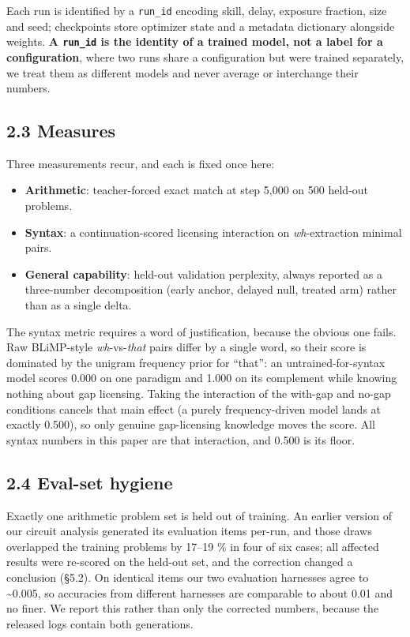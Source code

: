 \documentclass[11pt]{article}
\providecommand{\tightlist}{\setlength{\itemsep}{0pt}\setlength{\parskip}{0pt}}
\begin{document}
Each run is identified by a \texttt{run\_id} encoding skill, delay, exposure fraction, size and seed;
checkpoints store optimizer state and a metadata dictionary alongside weights. \textbf{A \texttt{run\_id}
is the identity of a trained model, not a label for a configuration}, where two runs share
a configuration but were trained separately, we treat them as different models and never
average or interchange their numbers.

\subsection{2.3 Measures}\label{measures}

Three measurements recur, and each is fixed once here:

\begin{itemize}
\tightlist
\item
  \textbf{Arithmetic}: teacher-forced exact match at step 5,000 on 500 held-out problems.
\item
  \textbf{Syntax}: a continuation-scored licensing interaction on \emph{wh}-extraction minimal pairs.
\item
  \textbf{General capability}: held-out validation perplexity, always reported as a three-number
  decomposition (early anchor, delayed null, treated arm) rather than as a single delta.
\end{itemize}

The syntax metric requires a word of justification, because the obvious one fails. Raw
BLiMP-style \emph{wh}-vs-\emph{that} pairs differ by a single word, so their score is dominated by the
unigram frequency prior for ``that'': an untrained-for-syntax model scores 0.000 on one
paradigm and 1.000 on its complement while knowing nothing about gap licensing. Taking the
interaction of the with-gap and no-gap conditions cancels that main effect (a purely
frequency-driven model lands at exactly 0.500), so only genuine gap-licensing knowledge moves
the score. All syntax numbers in this paper are that interaction, and 0.500 is its floor.

\subsection{2.4 Eval-set hygiene}\label{eval-set-hygiene}

Exactly one arithmetic problem set is held out of training. An earlier version of our circuit
analysis generated its evaluation items per-run, and those draws overlapped the training
problems by 17--19 \% in four of six cases; all affected results were re-scored on the held-out
set, and the correction changed a conclusion (§5.2). On identical items our two evaluation
harnesses agree to \textasciitilde0.005, so accuracies from different harnesses are comparable to about
0.01 and no finer. We report this rather than only the corrected numbers, because the
released logs contain both generations.
\end{document}
